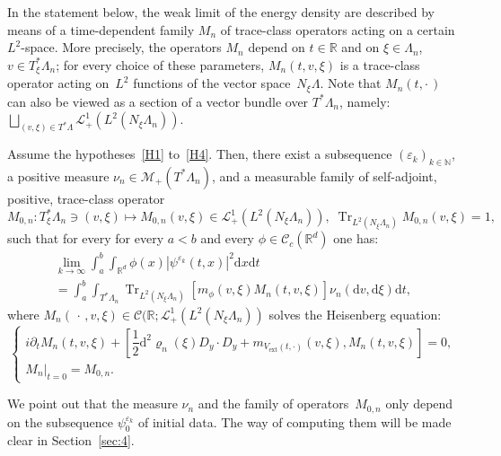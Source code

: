 \documentclass[AHL,Unicode,longabstracts]{cedram}
\DeclareMathOperator{\ext}{ext}
\DeclareMathOperator{\Trr}{Tr}
\newcommand*\R{{\mathbb R}}
\newcommand*\N{{\mathbb N}}
\newcommand*\eps{\varepsilon}
\newcommand*\Tr{\Trr}
\numberwithin{equation}{section}
\newcommand*{\dd}{\mathrm{d}}
\newcommand*{\dt}{\dd t}
\newcommand*{\dx}{\dd x}
\newcommand*{\dv}{\dd v}
\newcommand*{\dxi}{\dd \xi}
\begin{document}

In the statement below, the weak limit of the energy density are described by means of a time-dependent family $M_n$ of trace-class operators acting on a certain $L^2$-space. More precisely, the operators $M_n$ depend on $t\in\R$ and on $\xi\in\Lambda_n$, $v\in T^*_\xi\Lambda_n$; for every choice of these parameters, $M_n(t,v,\xi)$ is a trace-class operator acting on~$L^2$ functions of the vector space~$N_\xi\Lambda$. Note that $M_n(t,\cdot\,)$ can also be viewed as a section of a vector bundle over $T^*\Lambda_n$, namely: $\bigsqcup_{(v,\xi)\in T^*\Lambda}{\mathcal L}^1_+\left(L^2(N_\xi\Lambda_n)\right)$.



\begin{theo}\label{mainresult}
Assume the hypotheses~\eqref{H1} to~\eqref{H4}. Then, there exist a subsequence $(\eps_k)_{k\in\N}$, a positive measure $\nu_n\in\mathcal{M}_+(T^*\Lambda_n)$, and a measurable family of self-adjoint, positive, trace-class operator
\[
M_{0,n}:T^*_\xi\Lambda_n\ni (v,\xi)\longmapsto M_{0,n}(v,\xi)\in \mathcal{L}_+^1(L^2(N_\xi\Lambda_n)),\; \Tr_{L^2(N_\xi\Lambda_n)} M_{0,n}(v,\xi)=1,
\]
such that for every for every $a<b$ and every $\phi\in \mathcal{C}_c(\R^d)$ one has:
\begin{multline*}
\lim_{k\to\infty}\int_a^b\int_{\R^d}\phi(x)|\psi^{\eps_k}(t,x)|^2\dx\dt\\
=\int_a^b \int_{T^*\Lambda_n}\Tr_{L^2(N_\xi\Lambda_n)}\left[m_\phi(v,\xi)M_n(t,v,\xi)\right]\nu_n(\dv,\dxi)\dt,
\end{multline*}
where $M_n(\,\cdot\,, v,\xi)\in \mathcal{C}(\R;\mathcal{L}_+^1(L^2(N_\xi\Lambda_n))$ solves the Heisenberg equation:
\begin{equation}\label{eq:heis}
\begin{cases}
i\partial_t M_n(t,v,\xi) +\left[\dfrac{1}{2} \dd^2\varrho_n(\xi)D_y\cdot D_y + m_{V_{\ext}(t,\cdot)}(v,\xi), M_n(t,v,\xi)\right] =0,\\
M_n |_{t=0}=M_{0,n}.
\end{cases}
\end{equation}
\end{theo}

\begin{rema}
We point out that the measure $\nu_n$ and the family of operators~$M_{0,n}$ only depend on the subsequence $\psi^{\eps_k}_0$ of initial data. The way of computing them will be made clear in Section~\ref{sec:4}.
\end{rema}
\end{document}
